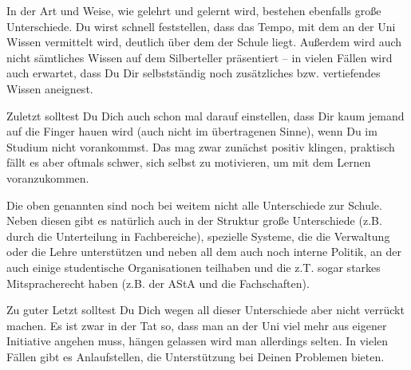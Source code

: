 {In der Art und Weise, wie gelehrt und gelernt wird, bestehen ebenfalls große Unterschiede. Du wirst schnell feststellen, dass das Tempo, mit dem an der Uni Wissen vermittelt wird, deutlich über dem der Schule liegt. Außerdem wird auch nicht sämtliches Wissen auf dem Silberteller präsentiert – in vielen Fällen wird auch erwartet, dass Du Dir selbstständig noch zusätzliches bzw. vertiefendes Wissen aneignest.

Zuletzt solltest Du Dich auch schon mal darauf einstellen, dass Dir kaum jemand auf die Finger hauen wird (auch nicht im übertragenen Sinne), wenn Du im Studium nicht vorankommst. Das mag zwar zunächst positiv klingen, praktisch fällt es aber oftmals schwer, sich selbst zu motivieren, um mit dem Lernen voranzukommen.

Die oben genannten sind noch bei weitem nicht alle Unterschiede zur Schule. Neben diesen gibt es natürlich auch in der Struktur große Unterschiede (z.B. durch die Unterteilung in Fachbereiche), spezielle Systeme, die die Verwaltung oder die Lehre unterstützen und neben all dem auch noch interne Politik, an der auch einige studentische Organisationen teilhaben und die z.T. sogar starkes Mitspracherecht haben (z.B. der AStA und die Fachschaften).

Zu guter Letzt solltest Du Dich wegen all dieser Unterschiede aber nicht verrückt machen. Es ist zwar in der Tat so, dass man an der Uni viel mehr aus eigener Initiative angehen muss, hängen gelassen wird man allerdings selten. In vielen Fällen gibt es Anlaufstellen, die Unterstützung bei Deinen Problemen bieten.
}
{}
